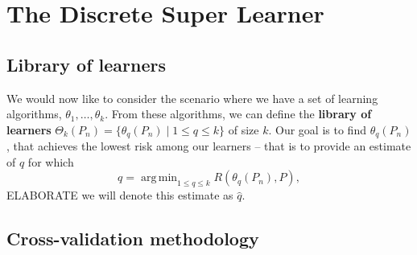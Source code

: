 \documentclass[11pt, a4paper]{article}
\DeclareMathOperator*{\argmin}{arg\,min}
\renewcommand\tag[1]{\color{blue} #1 \color{black}}
\theoremstyle{definition}
\theoremstyle{remark}
\newcommand{\q}{q}
\newcommand{\ml}{k}
\newcommand{\btheta}{\theta}
\newcommand{\lib}{\Theta}
\DeclareMathOperator{\expit}{expit}
\begin{document}


\section{The Discrete Super Learner}
\subsection{Library of learners}
We would now like to consider the scenario where we have a set of
learning algorithms, $ \btheta_1 , \ldots, \btheta_\ml $. From these
algorithms, we can define the \textbf{library of learners}
$ \lib_{k}(P_n) = \{\btheta_{\q}(P_n) \mid 1 \leq \q \leq \ml \} $ of
size $ \ml $. Our goal is to find $ \btheta_{\q}(P_n) $, that achieves
the lowest risk among our learners -- that is to provide an estimate
of $ \q $ for which
$$ \q = \argmin_{1 \leq \q \leq \ml} R(\theta_{\q}(P_n) , P), $$
\tag{ELABORATE}we will denote this estimate as $ \hat{q} $.

\subsection{Cross-validation methodology}
\end{document}
